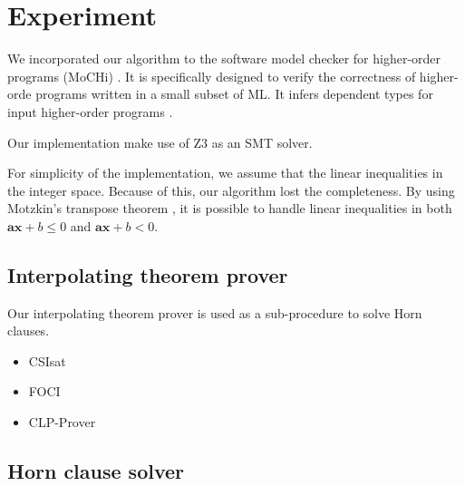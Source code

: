 \chapter{Experiment}
\label{chap:experiment}

We incorporated our algorithm to the software model checker for
higher-order programs (MoCHi) \cite{conf/pldi/KobayashiSU11}.  It
is specifically designed to verify the correctness of higher-orde
programs written in a small subset of ML.  It infers dependent types
for input higher-order programs \cite{conf/ppdp/UnnoK09}.

Our implementation make use of Z3 \cite{conf/tacas/MouraB08} as
an SMT solver.

For simplicity of the implementation, we assume that the linear
inequalities in the integer space.  Because of this, our algorithm
lost the completeness.  By using Motzkin's transpose theorem
\cite{journals/networks/Rajan90}, it is possible to handle linear
inequalities in both $\mathbf{ax} + b \leq 0$ and $\mathbf{ax} + b <
0$.


\section{Interpolating theorem prover}

Our interpolating theorem prover is used as a sub-procedure to solve
Horn clauses.

\begin{itemize}
\item CSIsat \cite{conf/cav/BeyerZM08}
\item FOCI \cite{website/foci}
\item CLP-Prover \cite{website/clp}
\end{itemize}

\section{Horn clause solver}
